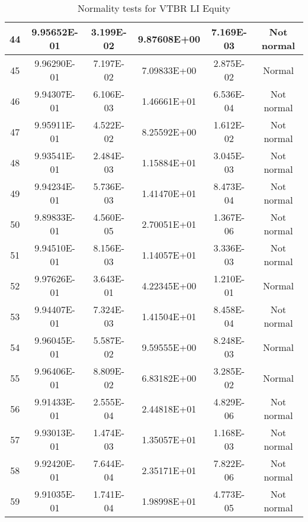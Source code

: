 \begin{table}[h]
\begin{tabular}{|c|c|c|c|c|c|}
		44 & 9.95652E-01 & 3.199E-02 & 9.87608E+00 & 7.169E-03 & Not normal\\\hline
		45 & 9.96290E-01 & 7.197E-02 & 7.09833E+00 & 2.875E-02 & Normal\\\hline
		46 & 9.94307E-01 & 6.106E-03 & 1.46661E+01 & 6.536E-04 & Not normal\\\hline
		47 & 9.95911E-01 & 4.522E-02 & 8.25592E+00 & 1.612E-02 & Not normal\\\hline
		48 & 9.93541E-01 & 2.484E-03 & 1.15884E+01 & 3.045E-03 & Not normal\\\hline
		49 & 9.94234E-01 & 5.736E-03 & 1.41470E+01 & 8.473E-04 & Not normal\\\hline
		50 & 9.89833E-01 & 4.560E-05 & 2.70051E+01 & 1.367E-06 & Not normal\\\hline
		51 & 9.94510E-01 & 8.156E-03 & 1.14057E+01 & 3.336E-03 & Not normal\\\hline
		52 & 9.97626E-01 & 3.643E-01 & 4.22345E+00 & 1.210E-01 & Normal\\\hline
		53 & 9.94407E-01 & 7.324E-03 & 1.41504E+01 & 8.458E-04 & Not normal\\\hline
		54 & 9.96045E-01 & 5.587E-02 & 9.59555E+00 & 8.248E-03 & Normal\\\hline
		55 & 9.96406E-01 & 8.809E-02 & 6.83182E+00 & 3.285E-02 & Normal\\\hline
		56 & 9.91433E-01 & 2.555E-04 & 2.44818E+01 & 4.829E-06 & Not normal\\\hline
		57 & 9.93013E-01 & 1.474E-03 & 1.35057E+01 & 1.168E-03 & Not normal\\\hline
		58 & 9.92420E-01 & 7.644E-04 & 2.35171E+01 & 7.822E-06 & Not normal\\\hline
		59 & 9.91035E-01 & 1.741E-04 & 1.98998E+01 & 4.773E-05 & Not normal\\\hline
	\end{tabular}
	\caption{Normality tests for VTBR LI Equity}
	\label{tab:normality_tests_VTBR_LI}
\end{table}
